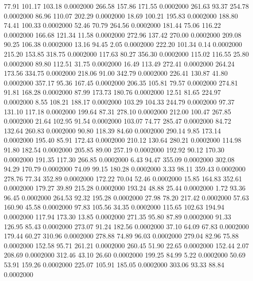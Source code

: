   77.91  101.17  103.18   0.0002000
 266.58  157.86  171.55   0.0002000
 261.63   93.37  254.78   0.0002000
  86.96  110.07  202.29   0.0002000
  18.69  100.21  195.83   0.0002000
 188.80   74.41  100.33   0.0002000
  52.46   70.79  264.56   0.0002000
 181.44   75.06  116.22   0.0002000
 166.68  121.34   11.58   0.0002000
 272.96  137.42  270.00   0.0002000
 209.08   90.25  106.38   0.0002000
  13.16   94.45    2.05   0.0002000
 222.20  101.34    0.14   0.0002000
 215.20  153.85  318.75   0.0002000
 117.63   80.27  356.30   0.0002000
 115.02  116.55   25.80   0.0002000
  89.80  112.51   31.75   0.0002000
  16.49  113.49  272.41   0.0002000
 264.24  173.56  334.75   0.0002000
 218.06   91.00  342.79   0.0002000
 226.41  130.87   41.80   0.0002000
 357.17   95.36  167.45   0.0002000
 206.35  105.81   79.57   0.0002000
 274.81   91.81  168.28   0.0002000
  87.99  173.73  180.76   0.0002000
  12.51   81.65  224.97   0.0002000
   8.55  108.21  188.17   0.0002000
 103.29  104.33  244.79   0.0002000
  97.37  131.10  117.18   0.0002000
 199.64   87.31  278.10   0.0002000
 212.00  100.47  267.85   0.0002000
  21.64  102.95   91.54   0.0002000
 103.07   74.77  285.47   0.0002000
  84.72  132.64  260.83   0.0002000
  90.80  118.39   84.60   0.0002000
 290.14    9.85  173.14   0.0002000
 195.40   85.91  172.43   0.0002000
 210.12  130.64  280.21   0.0002000
 114.98   91.80  182.54   0.0002000
 205.85   89.00  257.19   0.0002000
 192.92   90.12  170.30   0.0002000
 191.35  117.30  266.85   0.0002000
   6.43   94.47  355.09   0.0002000
 302.08   94.29  170.79   0.0002000
  74.09   99.15  180.28   0.0002000
   3.33   98.11  359.43   0.0002000
 278.76   77.34  352.89   0.0002000
 172.22   70.04   52.46   0.0002000
  15.85  164.83  352.61   0.0002000
 179.27   39.89  215.28   0.0002000
 193.24   48.88   25.44   0.0002000
   1.72   93.36   96.45   0.0002000
 264.53   92.32  195.28   0.0002000
  27.98   78.20  217.42   0.0002000
  57.63  160.90   45.58   0.0002000
  97.83  105.56   34.35   0.0002000
 115.65  102.63  194.94   0.0002000
 117.94  173.30   13.85   0.0002000
 271.35   95.80   87.89   0.0002000
  91.33  126.95   85.43   0.0002000
 273.07   91.24  182.56   0.0002000
  37.10   64.09   67.83   0.0002000
 179.44   60.27  310.96   0.0002000
 278.88   74.89   96.03   0.0002000
 279.04   82.96   75.88   0.0002000
 152.58   95.71  261.21   0.0002000
 260.45   51.90   22.65   0.0002000
 152.44    2.07  208.69   0.0002000
 312.46   43.10   26.60   0.0002000
 199.25   84.99    5.22   0.0002000
  50.69   53.91  159.26   0.0002000
 225.07  105.91  185.05   0.0002000
 303.06   93.33   88.84   0.0002000
